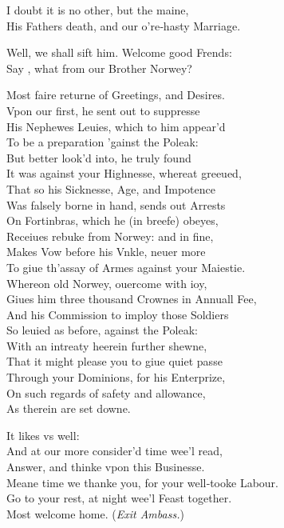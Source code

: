 \documentclass[a5paper,DIV=calc,11pt]{scrbook}
\begin{document}
\begin{drama*}
    \queenspeaks I doubt it is no other, but the maine,\\
    His Fathers death, and our o're‑hasty Marriage.
    
    
    \kingspeaks Well, we shall sift him. Welcome good Frends:\\
    Say \volt, what from our Brother Norwey?
    
    \voltspeaks Most faire returne of Greetings, and Desires.\\
    Vpon our first, he sent out to suppresse\\
    His Nephewes Leuies, which to him appear'd\\
    To be a preparation 'gainst the Poleak:\\
    But better look'd into, he truly found\\
    It was against your Highnesse, whereat greeued,\\
    That so his Sicknesse, Age, and Impotence\\
    Was falsely borne in hand, sends out Arrests\\
    On Fortinbras, which he (in breefe) obeyes,\\
    Receiues rebuke from Norwey: and in fine,\\
    Makes Vow before his Vnkle, neuer more\\
    To giue th'assay of Armes against your Maiestie.\\
    Whereon old Norwey, ouercome with ioy,\\
    Giues him three thousand Crownes in Annuall Fee,\\
    And his Commission to imploy those Soldiers\\
    So leuied as before, against the Poleak:\\
    With an intreaty heerein further shewne,\\
    That it might please you to giue quiet passe\\
    Through your Dominions, for his Enterprize,\\
    On such regards of safety and allowance,\\
    As therein are set downe.
    
    \kingspeaks It likes vs well:\\
    And at our more consider'd time wee'l read,\\
    Answer, and thinke vpon this Businesse.\\
    Meane time we thanke you, for your well‑tooke Labour.\\
    Go to your rest, at night wee'l Feast together.\\
    Most welcome home. \hfill(\textit{Exit Ambass.})
    

\end{drama*}
\end{document}
